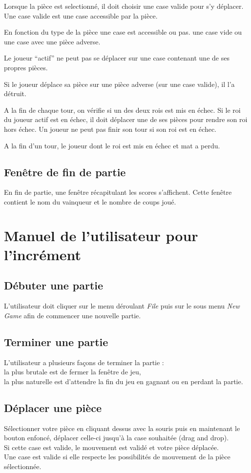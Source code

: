 \documentclass[12pt,a4paper]{report}
\begin{document}
Lorsque la pièce est selectionné, il doit choisir une case valide pour s'y déplacer. Une case valide est une case accessible par la pièce.

En fonction du type de la pièce une case est accessible ou pas. une case vide ou une case avec une pièce adverse.

Le joueur ``actif'' ne peut pas se déplacer sur une case contenant une de ses propres pièces.

Si le joueur déplace sa pièce sur une pièce adverse (sur une case valide), il l’a détruit.

A la fin de chaque tour, on vérifie si un des deux rois est mis en échec. Si le roi du joueur actif est en échec,
il doit déplacer une de ses pièces pour rendre son roi hors échec. Un joueur ne peut pas finir son tour si son roi est en échec.

A la fin d’un tour, le  joueur dont le roi est mis en échec et mat a perdu.

\section*{Fenêtre de fin de partie}
En fin de partie, une fenêtre récapitulant les scores s’affichent. Cette fenêtre contient le nom du vainqueur et le nombre de coups joué.

\maketitle
\chapter*{Manuel de l'utilisateur pour l'incrément}

\section*{Débuter une partie}
L'utilisateur doit cliquer sur le menu déroulant {\it File} puis sur le sous menu {\it New Game} afin de commencer une nouvelle partie.
\section*{Terminer une partie}
L'utilisateur a plusieurs façons de terminer la partie :
\\la plus brutale est de fermer la fenêtre de jeu, 
\\ la plus naturelle est d'attendre la fin du jeu en gagnant ou en perdant la partie. 
\section*{Déplacer une pièce}
Sélectionner votre pièce en cliquant dessus avec la souris puis en maintenant le bouton enfoncé, déplacer celle-ci jusqu'à la case souhaitée (drag and drop).
\\Si cette case est valide, le mouvement est validé et votre pièce déplacée.
\\Une case est valide si elle respecte les possibilités de mouvement de la pièce sélectionnée.
\end{document}
